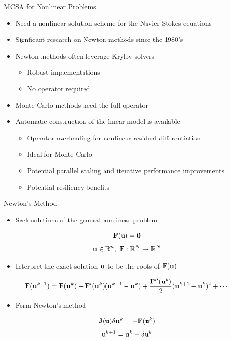 \documentclass{beamer}
\begin{document}
\begin{frame}{MCSA for Nonlinear Problems}

  \begin{itemize}
  \item Need a nonlinear solution scheme for the Navier-Stokes equations
    \bigskip
  \item Signficant research on Newton methods since the 1980's
    \bigskip
  \item Newton methods often leverage Krylov solvers
    \begin{itemize}
    \item Robust implementations
    \item No operator required
    \end{itemize}
    \bigskip
  \item Monte Carlo methods need the full operator
    \bigskip
  \item Automatic construction of the linear model is available
    \begin{itemize}
    \item Operator overloading for nonlinear residual differentiation
    \item Ideal for Monte Carlo
    \item Potential parallel scaling and iterative performance
      improvements
    \item Potential resiliency benefits
    \end{itemize}
  \end{itemize}

\end{frame}

\begin{frame}{Newton's Method}

  \begin{itemize}
  \item Seek solutions of the general nonlinear problem
  \end{itemize}

  \[
  \mathbf{F}(\mathbf{u}) = \mathbf{0}
  \]
  \[
  \mathbf{u} \in \mathbb{R}^n,\ \mathbf{F}:\mathbb{R}^N \rightarrow
  \mathbb{R}^N
  \]

  \begin{itemize}
  \item Interpret the exact solution $\mathbf{u}$ to be the roots of
    $\mathbf{F}(\mathbf{u})$
  \end{itemize}

  \[
  \mathbf{F}(\mathbf{u}^{k+1}) = \mathbf{F}(\mathbf{u}^{k}) +
  \mathbf{F}'(\mathbf{u}^{k})(\mathbf{u}^{k+1}-\mathbf{u}^{k}) +
  \frac{\mathbf{F}''(\mathbf{u}^{k})}{2}(\mathbf{u}^{k+1}-\mathbf{u}^{k})^2 + \cdots
  \]

  \begin{itemize}
  \item Form Newton's method
  \end{itemize}
  \[
  \mathbf{J}(\mathbf{u}) \delta \mathbf{u}^k = -\mathbf{F}(\mathbf{u}^{k})
  \]
  \[
  \mathbf{u}^{k+1} = \mathbf{u}^k + \delta \mathbf{u}^k
  \]

\end{frame}
\end{document}
